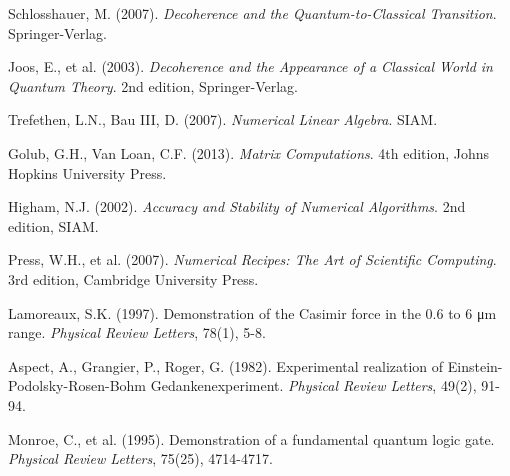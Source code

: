 \documentclass[12pt]{article}
\theoremstyle{plain}
\theoremstyle{definition}
\begin{document}
\begin{thebibliography}{99}
 Schlosshauer, M. (2007). \emph{Decoherence and the Quantum-to-Classical Transition}. Springer-Verlag.

 Joos, E., et al. (2003). \emph{Decoherence and the Appearance of a Classical World in Quantum Theory}. 2nd edition, Springer-Verlag.

 Trefethen, L.N., Bau III, D. (2007). \emph{Numerical Linear Algebra}. SIAM.

 Golub, G.H., Van Loan, C.F. (2013). \emph{Matrix Computations}. 4th edition, Johns Hopkins University Press.

 Higham, N.J. (2002). \emph{Accuracy and Stability of Numerical Algorithms}. 2nd edition, SIAM.

 Press, W.H., et al. (2007). \emph{Numerical Recipes: The Art of Scientific Computing}. 3rd edition, Cambridge University Press.

 Lamoreaux, S.K. (1997). Demonstration of the Casimir force in the 0.6 to 6 μm range. \emph{Physical Review Letters}, 78(1), 5-8.

 Aspect, A., Grangier, P., Roger, G. (1982). Experimental realization of Einstein-Podolsky-Rosen-Bohm Gedankenexperiment. \emph{Physical Review Letters}, 49(2), 91-94.

 Monroe, C., et al. (1995). Demonstration of a fundamental quantum logic gate. \emph{Physical Review Letters}, 75(25), 4714-4717.

\end{thebibliography}
\end{document}
